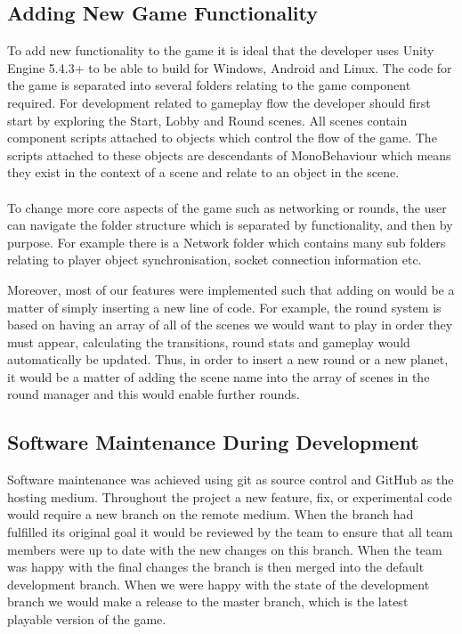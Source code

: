 \documentclass[11pt,a4paper]{article}
\begin{document}
 \subsection{Adding New Game Functionality}
 To add new functionality to the game it is ideal that the developer uses Unity Engine 5.4.3+ to be able to build for Windows, Android and Linux. The code for the game is separated into several folders relating to the game component required. For development related to gameplay flow the developer should first start by exploring the Start, Lobby and Round scenes. All scenes contain component scripts attached to objects which control the flow of the game. The scripts attached to these objects are descendants of MonoBehaviour which means they exist in the context of a scene and relate to an object in the scene.\\ \\
 To change more core aspects of the game such as networking or rounds, the user can navigate the folder structure which is separated by functionality, and then by purpose. For example there is a Network folder which contains many sub folders relating to player object synchronisation, socket connection information etc.

Moreover, most of our features were implemented such that adding on would be a matter of simply inserting a new line of code. For example, the round system is based on having an array of all of the scenes we would want to play in order they must appear, calculating the transitions, round stats and gameplay would automatically be updated. Thus, in order to insert a new round or a new planet, it would be a matter of adding the scene name into the array of scenes in the round manager and this would enable further rounds.

 \subsection{Software Maintenance During Development}
 Software maintenance was achieved using git as source control and GitHub as the hosting medium. Throughout the project a new feature, fix, or experimental code would require a new branch on the remote medium. When the branch had fulfilled its original goal it would be reviewed by the team to ensure that all team members were up to date with the new changes on this branch. When the team was happy with the final changes the branch is then merged into the default development branch. When we were happy with the state of the development branch we would make a release to the master branch, which is the latest playable version of the game.
\end{document}

